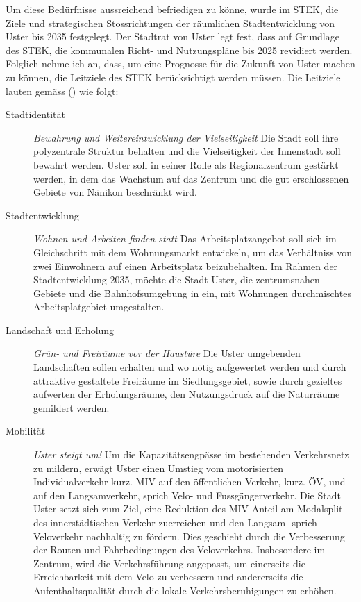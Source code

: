 Um diese Bedürfnisse aussreichend befriedigen zu könne, wurde im STEK, die Ziele und strategischen Stossrichtungen der räumlichen Stadtentwicklung von Uster bis 2035 festgelegt. Der Stadtrat von Uster legt fest, dass auf Grundlage des STEK, die kommunalen Richt- und Nutzungspläne bis 2025 revidiert werden. Folglich nehme ich an, dass, um eine Prognosse für die Zukunft von Uster machen zu können, die Leitziele des STEK berücksichtigt werden müssen. Die Leitziele lauten gemäss (\cite{STEK}) wie folgt: 

\begin{description}
	\item[Stadtidentität]	\textit{Bewahrung und Weitereintwicklung der Vielseitigkeit} Die Stadt soll ihre polyzentrale Struktur behalten und die Vielseitigkeit der Innenstadt soll bewahrt werden. Uster soll in seiner Rolle als Regionalzentrum gestärkt werden, in dem das Wachstum auf das Zentrum und die gut erschlossenen Gebiete von Nänikon beschränkt wird.
	\item[Stadtentwicklung]	\textit{Wohnen und Arbeiten finden statt} Das Arbeitsplatzangebot soll sich im Gleichschritt mit dem Wohnungsmarkt entwickeln, um das Verhältniss von zwei Einwohnern auf einen Arbeitsplatz beizubehalten. Im Rahmen der Stadtentwicklung 2035, möchte die Stadt Uster, die zentrumsnahen Gebiete und die Bahnhofsumgebung in ein, mit Wohnungen durchmischtes Arbeitsplatgebiet umgestalten. 
	\item[Landschaft und Erholung] \textit{Grün- und Freiräume vor der Haustüre} Die Uster umgebenden Landschaften sollen erhalten und wo nötig aufgewertet werden und durch attraktive gestaltete Freiräume im Siedlungsgebiet, sowie durch gezieltes aufwerten der Erholungsräume, den Nutzungsdruck auf die Naturräume gemildert werden. 
	\item[Mobilität] \textit{Uster steigt um!} Um die Kapazitätsengpässe im bestehenden Verkehrsnetz zu mildern, erwägt Uster einen Umstieg vom motorisierten Individualverkehr kurz. MIV auf den öffentlichen Verkehr, kurz. ÖV, und auf den Langsamverkehr, sprich Velo- und Fussgängerverkehr. Die Stadt Uster setzt sich zum Ziel, eine Reduktion des MIV Anteil am Modalsplit des innerstädtischen Verkehr zuerreichen und den Langsam- sprich Veloverkehr nachhaltig zu fördern. Dies geschieht durch die Verbesserung der Routen und Fahrbedingungen des Veloverkehrs. Insbesondere im Zentrum, wird die Verkehrsführung angepasst, um einerseits die Erreichbarkeit mit dem Velo zu verbessern und andererseits die Aufenthaltsqualität durch die lokale Verkehrsberuhigungen zu erhöhen.
\end{description}

